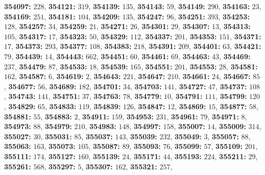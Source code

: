 \textsf{\bfseries 354097:} $228$, \textsf{\bfseries 354121:} $319$, \textsf{\bfseries 354139:} $135$, \textsf{\bfseries 354143:} $59$, \textsf{\bfseries 354149:} $290$, \textsf{\bfseries 354163:} $23$, \textsf{\bfseries 354169:} $251$, \textsf{\bfseries 354181:} $104$, \textsf{\bfseries 354209:} $135$, \textsf{\bfseries 354247:} $96$, \textsf{\bfseries 354251:} $393$, \textsf{\bfseries 354253:} $128$, \textsf{\bfseries 354257:} $34$, \textsf{\bfseries 354259:} $21$, \textsf{\bfseries 354271:} $26$, \textsf{\bfseries 354301:} $29$, \textsf{\bfseries 354307:} $13$, \textsf{\bfseries 354313:} $105$, \textsf{\bfseries 354317:} $17$, \textsf{\bfseries 354323:} $50$, \textsf{\bfseries 354329:} $112$, \textsf{\bfseries 354337:} $201$, \textsf{\bfseries 354353:} $151$, \textsf{\bfseries 354371:} $17$, \textsf{\bfseries 354373:} $293$, \textsf{\bfseries 354377:} $108$, \textsf{\bfseries 354383:} $218$, \textsf{\bfseries 354391:} $209$, \textsf{\bfseries 354401:} $63$, \textsf{\bfseries 354421:} $79$, \textsf{\bfseries 354439:} $14$, \textsf{\bfseries 354443:} $662$, \textsf{\bfseries 354451:} $60$, \textsf{\bfseries 354461:} $69$, \textsf{\bfseries 354463:} $43$, \textsf{\bfseries 354469:} $237$, \textsf{\bfseries 354479:} $87$, \textsf{\bfseries 354533:} $18$, \textsf{\bfseries 354539:} $165$, \textsf{\bfseries 354551:} $201$, \textsf{\bfseries 354553:} $28$, \textsf{\bfseries 354581:} $162$, \textsf{\bfseries 354587:} $6$, \textsf{\bfseries 354619:} $2$, \textsf{\bfseries 354643:} $221$, \textsf{\bfseries 354647:} $210$, \textsf{\bfseries 354661:} $24$, \textsf{\bfseries 354667:} $85$, \textsf{\bfseries 354677:} $56$, \textsf{\bfseries 354689:} $182$, \textsf{\bfseries 354701:} $34$, \textsf{\bfseries 354703:} $141$, \textsf{\bfseries 354727:} $47$, \textsf{\bfseries 354737:} $108$, \textsf{\bfseries 354743:} $141$, \textsf{\bfseries 354751:} $37$, \textsf{\bfseries 354763:} $78$, \textsf{\bfseries 354779:} $10$, \textsf{\bfseries 354791:} $111$, \textsf{\bfseries 354799:} $120$, \textsf{\bfseries 354829:} $65$, \textsf{\bfseries 354833:} $119$, \textsf{\bfseries 354839:} $126$, \textsf{\bfseries 354847:} $12$, \textsf{\bfseries 354869:} $15$, \textsf{\bfseries 354877:} $58$, \textsf{\bfseries 354881:} $55$, \textsf{\bfseries 354883:} $2$, \textsf{\bfseries 354911:} $159$, \textsf{\bfseries 354953:} $231$, \textsf{\bfseries 354961:} $79$, \textsf{\bfseries 354971:} $8$, \textsf{\bfseries 354973:} $88$, \textsf{\bfseries 354979:} $210$, \textsf{\bfseries 354983:} $148$, \textsf{\bfseries 354997:} $158$, \textsf{\bfseries 355007:} $14$, \textsf{\bfseries 355009:} $314$, \textsf{\bfseries 355027:} $30$, \textsf{\bfseries 355031:} $85$, \textsf{\bfseries 355037:} $143$, \textsf{\bfseries 355039:} $232$, \textsf{\bfseries 355049:} $3$, \textsf{\bfseries 355057:} $88$, \textsf{\bfseries 355063:} $163$, \textsf{\bfseries 355073:} $105$, \textsf{\bfseries 355087:} $89$, \textsf{\bfseries 355093:} $76$, \textsf{\bfseries 355099:} $57$, \textsf{\bfseries 355109:} $201$, \textsf{\bfseries 355111:} $174$, \textsf{\bfseries 355127:} $160$, \textsf{\bfseries 355139:} $24$, \textsf{\bfseries 355171:} $44$, \textsf{\bfseries 355193:} $224$, \textsf{\bfseries 355211:} $29$, \textsf{\bfseries 355261:} $568$, \textsf{\bfseries 355297:} $5$, \textsf{\bfseries 355307:} $162$, \textsf{\bfseries 355321:} $257$, 
